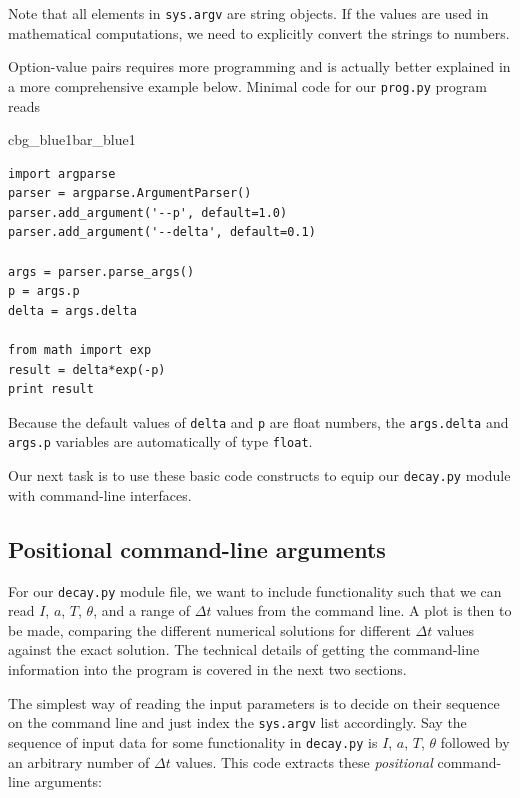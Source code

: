 \documentclass[%
oneside,                 %
final,                   %
10pt]{article}
\newenvironment{_pro_tight}[2]{
   \def\FrameCommand{\color{#2}\vrule width 1mm\normalcolor\colorbox{#1}}
   \FrameRule0.6pt\MakeFramed {\advance\hsize-2mm\FrameRestore}\vskip3mm}
   {\vskip0mm\endMakeFramed}
\newenvironment{pro}[2]{
\bgroup\rmfamily
\fboxsep=0mm\relax
\begin{_pro_tight}{#1}{#2}
\list{}{\parsep=-2mm\parskip=0mm\topsep=0pt\leftmargin=2mm
\rightmargin=2\leftmargin\leftmargin=4pt\relax}
\item\relax}
{\endlist\end{_pro_tight}\egroup}
\newenvironment{warning_mdfboxadmon}[1][]{
\begin{warning_mdfboxmdframed}[frametitle=#1]
}
{
\end{warning_mdfboxmdframed}
}
\begin{document}
\begin{warning_mdfboxadmon}
Note that all elements in \texttt{sys.argv} are string objects.
If the values are used in mathematical computations, we need
to explicitly convert the strings to numbers.
\end{warning_mdfboxadmon}



Option-value pairs requires more programming and is actually
better explained in a more comprehensive example below.
Minimal code for our \texttt{prog.py} program reads

\begin{pro}{cbg_blue1}{bar_blue1}\begin{Verbatim}[numbers=none,fontsize=\fontsize{9pt}{9pt},baselinestretch=0.95,xleftmargin=2mm]
import argparse
parser = argparse.ArgumentParser()
parser.add_argument('--p', default=1.0)
parser.add_argument('--delta', default=0.1)

args = parser.parse_args()
p = args.p
delta = args.delta

from math import exp
result = delta*exp(-p)
print result
\end{Verbatim}
\end{pro}
\noindent
Because the default values of \texttt{delta} and \texttt{p} are float numbers,
the \texttt{args.delta} and \texttt{args.p} variables are automatically of type \texttt{float}.

Our next task is to use these basic code constructs to equip our
\texttt{decay.py} module with command-line interfaces.

\subsection{Positional command-line arguments}


For our \texttt{decay.py} module file, we want to include functionality such
that we can read $I$, $a$, $T$, $\theta$, and a range of $\Delta t$
values from the command line.  A plot is then to be made, comparing
the different numerical solutions for different $\Delta t$ values
against the exact solution. The technical details of getting the
command-line information into the program is covered in the next
two sections.

The simplest way of reading the input parameters is to
decide on their sequence on the command line and just index
the \texttt{sys.argv} list accordingly.
Say the sequence of input data for some functionality in
\texttt{decay.py} is $I$, $a$, $T$, $\theta$ followed by an
arbitrary number of $\Delta t$ values. This code extracts
these \emph{positional} command-line arguments:
\end{document}
